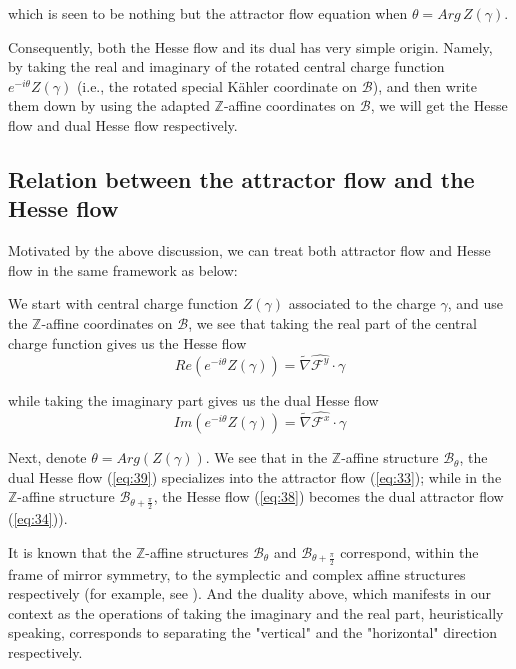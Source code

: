 \documentclass{article}
\begin{document}
which is seen to be nothing but the attractor flow equation when $\theta=Arg\,Z(\gamma)$. 

Consequently, both the Hesse flow and its dual has very simple origin. Namely, by taking the real and imaginary of the rotated central charge function $e^{-i\theta}Z(\gamma)$ (i.e., the rotated special K\"ahler coordinate on $\mathcal{B}$),  and then write them down by using the adapted $\mathbb{Z}$-affine coordinates on $\mathcal{B}$, we will get the Hesse flow and dual Hesse flow respectively. 

\subsection{Relation between the attractor flow and the Hesse flow}\label{sec:4.3}

Motivated by the above discussion, we can treat both attractor flow and Hesse flow in the same framework as below:

We start with central charge function $Z(\gamma)$ associated to the charge $\gamma$, and use the $\mathbb{Z}$-affine coordinates on $\mathcal{B}$, we see that taking the real part of the central charge function gives us the Hesse flow
\begin{equation}\label{eq:38}
    Re\left(e^{-i\theta}Z(\gamma)\right)=\widetilde{\nabla}\widehat{\mathscr{F}^{y}}\cdot\gamma
\end{equation}

while taking the imaginary part gives us the dual Hesse flow
\begin{equation}\label{eq:39}
    Im\left(e^{-i\theta}Z(\gamma)\right)=\widetilde{\nabla}\widehat{\mathscr{F}^{x}}\cdot\gamma
\end{equation}

Next, denote $\theta=Arg\left(Z(\gamma)\right)$. We see that in the $\mathbb{Z}$-affine structure $\mathcal{B}_{\theta}$, the dual Hesse flow (\ref{eq:39}) specializes into the attractor flow (\ref{eq:33}); while in the $\mathbb{Z}$-affine structure $\mathcal{B}_{\theta+\frac{\pi}{2}}$, the Hesse flow (\ref{eq:38}) becomes the dual attractor flow (\ref{eq:34})).

\vspace{7pt}

\begin{remark}
It is known that the $\mathbb{Z}$-affine structures $\mathcal{B}_{\theta}$ and $\mathcal{B}_{\theta+\frac{\pi}{2}}$ correspond, within the frame of mirror symmetry, to the symplectic and complex affine structures respectively (for example, see \cite{lin2017open}). And the duality above,  which manifests in our context as the operations of taking the imaginary and the real part, heuristically speaking, corresponds to separating the "vertical" and the "horizontal" direction respectively.
\end{remark}





\end{document}

